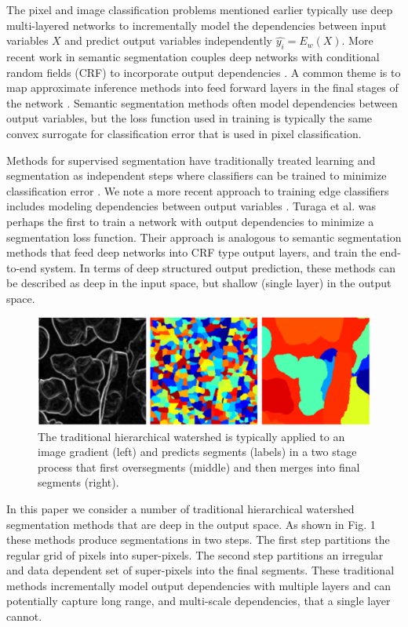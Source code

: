 \documentclass[letterpaper,twocolumn,fleqn]{article}
\begin{document}
The pixel and image classification problems mentioned earlier typically use deep multi-layered networks to incrementally model the dependencies between input variables $X$ and predict output variables independently $\widehat{y_i} = E_{w}(X)$. More recent work in semantic segmentation couples deep networks with conditional random fields (CRF) \cite{Sutton2011} to incorporate output dependencies \cite{Chen2014}. A common theme is to map approximate inference methods into feed forward layers in the final stages of the network \cite{Zheng2015}. Semantic segmentation methods often model dependencies between output variables, but the loss function used in training is typically the same convex surrogate for classification error that is used in pixel classification. 

Methods for supervised segmentation have traditionally treated learning and segmentation as independent steps where classifiers can be trained to minimize classification error \cite{Arbelaez2011}. We note a more recent approach to training edge classifiers includes modeling dependencies between output variables \cite{Dollar2013}. Turaga et al.\cite{turaga} was perhaps the first to train a network with output dependencies to minimize a segmentation loss function. Their approach is analogous to semantic segmentation methods that feed deep networks into CRF type output layers, and train the end-to-end system. In terms of deep structured output prediction, these methods can be described as deep in the input space, but shallow (single layer) in the output space. 

\begin{figure}[h!]
    \centering
    \includegraphics[height = 0.117\textheight]{Image_Hierarchy.png}
    \caption{The traditional hierarchical watershed is typically applied to an image gradient (left) and predicts segments (labels) in a two stage process that first oversegments (middle) and then merges into final segments (right).}
    \label{fig:image_example}
\end{figure}

In this paper we consider a number of traditional hierarchical watershed segmentation methods that are deep in the output space. As shown in Fig. 1 these methods produce segmentations in two steps. The first step partitions the regular grid of pixels into super-pixels. The second step partitions an irregular and data dependent set of super-pixels into the final segments. These traditional methods incrementally model output dependencies with multiple layers and can potentially capture long range, and multi-scale dependencies, that a single layer cannot. 
\end{document}
